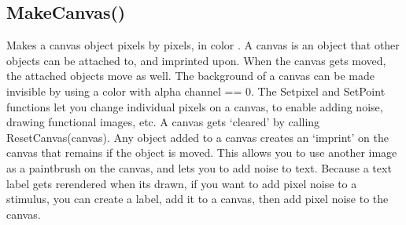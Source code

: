 \documentclass[letterpaper,10pt,english]{sphinxmanual}
\begin{document}
\ignorespaces 

\subsection{MakeCanvas()}
\label{\detokenize{reference/peblobjects:makecanvas}}\label{\detokenize{reference/peblobjects:index-21}}
\sphinxAtStartPar
{}

\sphinxAtStartPar
{}

\sphinxAtStartPar
Makes a canvas object   pixels by    pixels, in color .  A canvas is an object that other objects can be attached to, and imprinted upon. When the canvas gets moved, the attached objects move as well. The background of a canvas can be made invisible by using a color with alpha channel == 0. The Setpixel and SetPoint functions let you change individual pixels on a canvas, to enable adding noise, drawing functional images, etc. A canvas gets ‘cleared’ by calling ResetCanvas(canvas). Any object added to a canvas creates an ‘imprint’ on the canvas that remains if the object is moved.  This allows you to use another image as a paintbrush on the canvas, and lets you to add noise to text. Because a text label gets re\sphinxhyphen{}rendered when its drawn, if you want to add pixel noise to a stimulus, you can create a label, add it to a canvas, then add pixel noise to the canvas.

\sphinxAtStartPar
{}

\begin{sphinxVerbatim}[commandchars=\\\{\}]
\end{sphinxVerbatim}

\sphinxAtStartPar
{}
\end{document}
